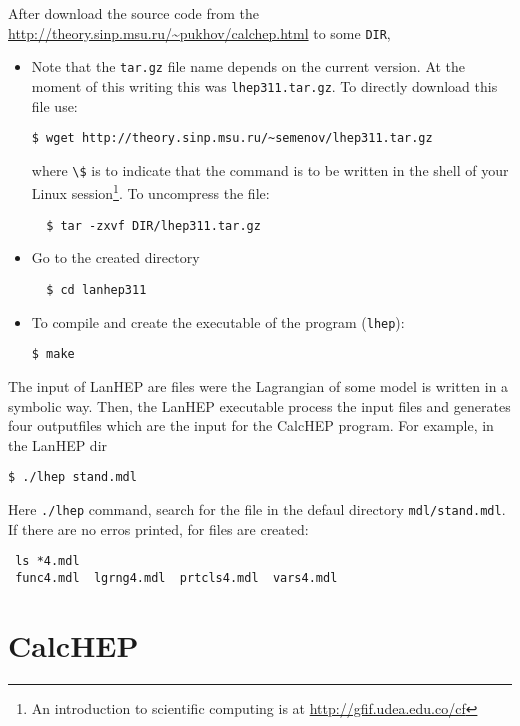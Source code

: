 \begin{frame}{}
After download the source code from the \url{http://theory.sinp.msu.ru/~pukhov/calchep.html} to some \lstinline{DIR}, 
\begin{itemize}
\item Note that the \lstinline{tar.gz} file name depends on the current version. At the moment of this writing this was \lstinline{lhep311.tar.gz}. To directly download this file use:
\begin{lstlisting}
$ wget http://theory.sinp.msu.ru/~semenov/lhep311.tar.gz
\end{lstlisting}
where \lstinline{\$} is to indicate that the command is to be written in the shell of your Linux session\footnote{An introduction to scientific computing is at \url{http://gfif.udea.edu.co/cf} }.
To uncompress the file:\\
\begin{lstlisting}
  $ tar -zxvf DIR/lhep311.tar.gz
\end{lstlisting}

\item Go to the created directory
\begin{lstlisting}
  $ cd lanhep311
\end{lstlisting}

\item To compile and create the executable of the program (\lstinline{lhep}):\\
\begin{lstlisting}
$ make
\end{lstlisting}
\end{itemize}


The input of LanHEP are files were the Lagrangian of some model is written in a symbolic way. Then, the LanHEP executable process the input files and generates four outputfiles which are the input for the CalcHEP program. For example, in the LanHEP dir

\begin{lstlisting}
$ ./lhep stand.mdl
\end{lstlisting}
Here \lstinline{./lhep} command, search for the file in the defaul directory \lstinline{mdl/stand.mdl}. If there are no erros printed, for files are created:
\begin{lstlisting}
 ls *4.mdl
 func4.mdl  lgrng4.mdl  prtcls4.mdl  vars4.mdl
\end{lstlisting}


\section{CalcHEP}


\end{frame}
